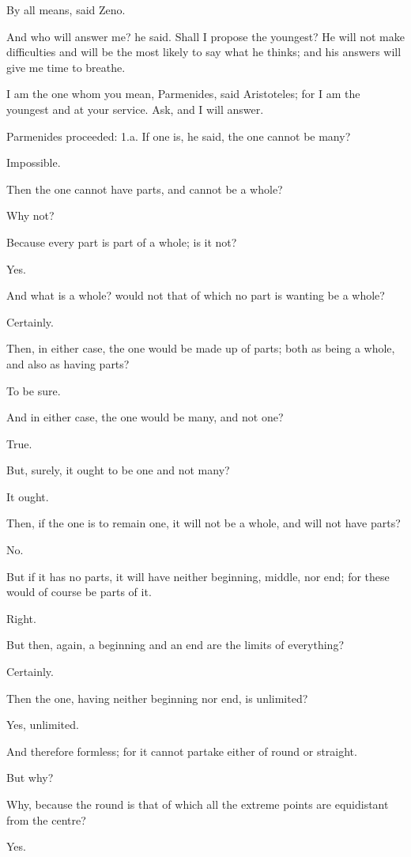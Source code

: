 By all means, said Zeno.

And who will answer me? he said. Shall I propose the youngest? He will
not make difficulties and will be the most likely to say what he thinks;
and his answers will give me time to breathe.

I am the one whom you mean, Parmenides, said Aristoteles; for I am the
youngest and at your service. Ask, and I will answer.

Parmenides proceeded: 1.a. If one is, he said, the one cannot be many?

Impossible.

Then the one cannot have parts, and cannot be a whole?

Why not?

Because every part is part of a whole; is it not?

Yes.

And what is a whole? would not that of which no part is wanting be a
whole?

Certainly.

Then, in either case, the one would be made up of parts; both as being a
whole, and also as having parts?

To be sure.

And in either case, the one would be many, and not one?

True.

But, surely, it ought to be one and not many?

It ought.

Then, if the one is to remain one, it will not be a whole, and will not
have parts?

No.

But if it has no parts, it will have neither beginning, middle, nor end;
for these would of course be parts of it.

Right.

But then, again, a beginning and an end are the limits of everything?

Certainly.

Then the one, having neither beginning nor end, is unlimited?

Yes, unlimited.

And therefore formless; for it cannot partake either of round or
straight.

But why?

Why, because the round is that of which all the extreme points are
equidistant from the centre?

Yes.

